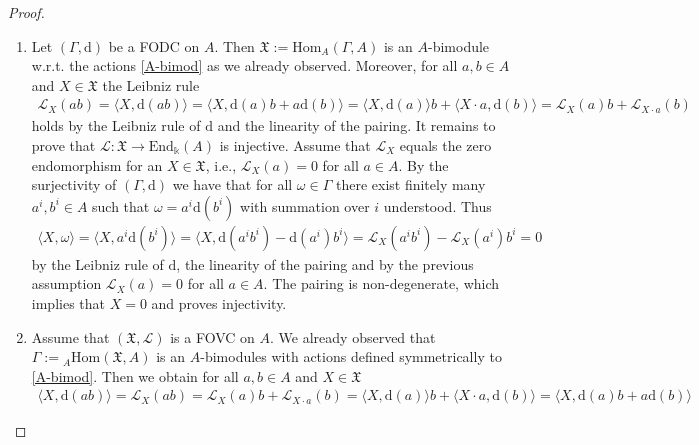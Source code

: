 \documentclass{article}
\theoremstyle{definition}
\begin{document}
	\begin{proof}
		\begin{enumerate}
			\item[i.)] Let $(\Gamma,\mathrm{d})$ be a FODC on $A$. Then $\mathfrak{X}:=\mathrm{Hom}_A(\Gamma,A)$ is an $A$-bimodule w.r.t. the actions \eqref{A-bimod} as we already observed. Moreover, for all $a,b\in A$ and $X\in\mathfrak{X}$ the Leibniz rule
			\begin{align*}
				\mathscr{L}_X(ab)
				=\langle X,\mathrm{d}(ab)\rangle
				=\langle X,\mathrm{d}(a)b+a\mathrm{d}(b)\rangle
				=\langle X,\mathrm{d}(a)\rangle b+\langle X\cdot a,\mathrm{d}(b)\rangle
				=\mathscr{L}_X(a)b+\mathscr{L}_{X\cdot a}(b)
			\end{align*}
			holds by the Leibniz rule of $\mathrm{d}$ and the linearity of the pairing. It remains to prove that $\mathscr{L}\colon\mathfrak{X}\to\mathrm{End}_\Bbbk(A)$ is injective. Assume that $\mathscr{L}_X$ equals the zero endomorphism for an $X\in\mathfrak{X}$, i.e., $\mathscr{L}_X(a)=0$ for all $a\in A$. By the surjectivity of $(\Gamma,\mathrm{d})$ we have that for all $\omega\in\Gamma$ there exist finitely many $a^i,b^i\in A$ such that $\omega=a^i\mathrm{d}(b^i)$ with summation over $i$ understood. Thus
			\begin{align*}
				\langle X,\omega\rangle
				=\langle X,a^i\mathrm{d}(b^i)\rangle
				=\langle X,\mathrm{d}(a^ib^i)-\mathrm{d}(a^i)b^i\rangle
				=\mathscr{L}_X(a^ib^i)-\mathscr{L}_X(a^i)b^i
				=0
			\end{align*}
			by the Leibniz rule of $\mathrm{d}$, the linearity of the pairing and by the previous assumption $\mathscr{L}_X(a)=0$ for all $a\in A$. The pairing is non-degenerate, which implies that $X=0$ and proves injectivity.
			\item[ii.)] Assume that $(\mathfrak{X},\mathscr{L})$ is a FOVC on $A$. We already observed that $\Gamma:={}_A\mathrm{Hom}(\mathfrak{X},A)$ is an $A$-bimodules with actions defined symmetrically to \eqref{A-bimod}. Then we obtain for all $a,b\in A$ and $X\in\mathfrak{X}$
			\begin{align*}
				\langle X,\mathrm{d}(ab)\rangle
				=\mathscr{L}_X(ab)
				=\mathscr{L}_X(a)b+\mathscr{L}_{X\cdot a}(b)
				=\langle X,\mathrm{d}(a)\rangle b+\langle X\cdot a,\mathrm{d}(b)\rangle
				=\langle X,\mathrm{d}(a)b+a\mathrm{d}(b)\rangle
			\end{align*}

\end{enumerate}
\end{proof}
\end{document}
